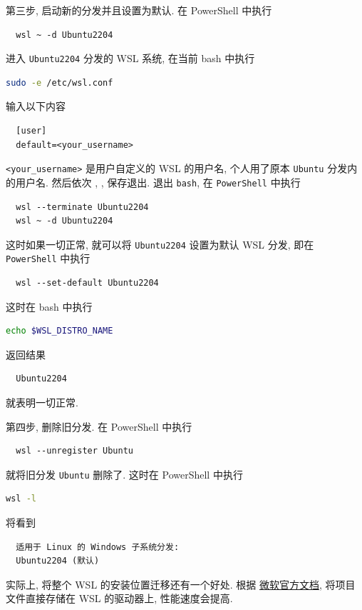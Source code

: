 第三步,
启动新的分发并且设置为默认.
在 \textsf{PowerShell} 中执行
\begin{lstlisting}
  wsl ~ -d Ubuntu2204
\end{lstlisting}
进入 \texttt{Ubuntu2204} 分发的 WSL 系统,
在当前 \textsf{bash} 中执行
\begin{lstlisting}[language=bash]
  sudo -e /etc/wsl.conf
\end{lstlisting}
输入以下内容
\begin{lstlisting}
  [user]
  default=<your_username>
\end{lstlisting}
\texttt{<your\_username>} 是用户自定义的 WSL 的用户名,
个人用了原本 \texttt{Ubuntu} 分发内的用户名.
然后依次 , , \keys{\enter} 保存退出.
退出 \texttt{bash},
在 \texttt{PowerShell} 中执行
\begin{lstlisting}
  wsl --terminate Ubuntu2204
  wsl ~ -d Ubuntu2204
\end{lstlisting}
这时如果一切正常,
就可以将 \texttt{Ubuntu2204} 设置为默认 WSL 分发,
即在 \texttt{PowerShell} 中执行
\begin{lstlisting}
  wsl --set-default Ubuntu2204
\end{lstlisting}
这时在 \textsf{bash} 中执行
\begin{lstlisting}[language=bash]
  echo $WSL_DISTRO_NAME
\end{lstlisting}
返回结果
\begin{lstlisting}
  Ubuntu2204
\end{lstlisting}
就表明一切正常.

第四步,
删除旧分发.
在 \textsf{PowerShell} 中执行
\begin{lstlisting}
  wsl --unregister Ubuntu
\end{lstlisting}
就将旧分发 \texttt{Ubuntu} 删除了.
这时在 \textsf{PowerShell} 中执行
\begin{lstlisting}[language=bash]
  wsl -l
\end{lstlisting}
将看到
\begin{lstlisting}
  适用于 Linux 的 Windows 子系统分发:
  Ubuntu2204 (默认)
\end{lstlisting}

实际上,
将整个 WSL 的安装位置迁移还有一个好处.
根据%
\href{https://learn.microsoft.com/zh-cn/windows/wsl/filesystems#file-storage-and-performance-across-file-systems}{微软官方文档},
将项目文件直接存储在 WSL 的驱动器上,
性能速度会提高.